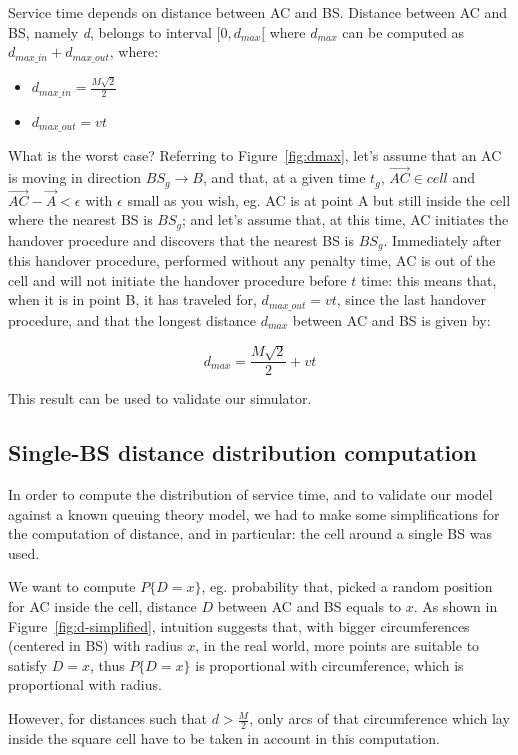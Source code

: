 \documentclass[a4paper,12pt]{article}
\begin{document}
Service time depends on distance between AC and BS.
Distance between AC and BS, namely \emph{d}, belongs to interval $[ 0, d_{max} [$ where $d_{max}$ can be computed as $d_{max\_in} + d_{max\_out}$, where:
\begin{itemize}
  \item $d_{max\_in} = \frac{M \sqrt{2}}{2} $
  \item $d_{max\_out} = vt$
\end{itemize}

What is the worst case? Referring to Figure~\ref{fig:dmax}, let's assume that an AC is moving in direction $BS_g \rightarrow B$, and that, at a given time $t_g$, $\overrightarrow{AC} \in cell$ and $\overrightarrow{AC} - \overrightarrow{A} < \epsilon$ with $\epsilon$ small as you wish, eg. AC is at point A but still inside the cell where the nearest BS is $BS_g$; and let's assume that, at this time, AC initiates the handover procedure and discovers that the nearest BS is $BS_g$. Immediately after this handover procedure, performed without any penalty time, AC is out of the cell and will not initiate the handover procedure before $t$ time: this means that, when it is in point B, it has traveled for, $d_{max\_out} = v t$, since the last handover procedure, and that the longest distance $d_{max}$ between AC and BS is given by:

$$ d_{max} = \frac{M \sqrt{2}}{2} + vt $$

This result can be used to validate our simulator.

\subsection{Single-BS distance distribution computation}
\label{sec:singlebs-ddc}
In order to compute the distribution of service time, and to validate our model against a known queuing theory model, we had to make some simplifications for the computation of distance, and in particular: the cell around a single BS was used.

We want to compute $P\{D = x\}$, eg. probability that, picked a random position for AC inside the cell, distance $D$ between AC and BS equals to $x$.
As shown in Figure~\ref{fig:d-simplified}, intuition suggests that, with bigger circumferences (centered in BS) with radius $x$, in the real world, more points are suitable to satisfy $D = x$, thus $P\{D = x\}$ is proportional with circumference, which is proportional with radius.

However, for distances such that $d > \frac{M}{2}$, only arcs of that circumference which lay inside the square cell have to be taken in account in this computation.
\end{document}
